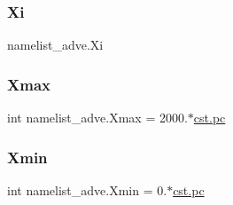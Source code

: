 \subsubsection{\texorpdfstring{Xi}{Xi}}
{\footnotesize\ttfamily namelist\+\_\+adve.\+Xi}

\mbox{\label{namespacenamelist__adve_a72dd501f8f17b05467f30b55d0507e79}} 
\subsubsection{\texorpdfstring{Xmax}{Xmax}}
{\footnotesize\ttfamily int namelist\+\_\+adve.\+Xmax = 2000.$\ast$\hyperlink{constants_8h_a2884cd030c4c825754349a525a1d06ce}{cst.\+pc}}

\mbox{\label{namespacenamelist__adve_a4c1840cec878f104fe26d7975343fe76}} 
\subsubsection{\texorpdfstring{Xmin}{Xmin}}
{\footnotesize\ttfamily int namelist\+\_\+adve.\+Xmin = 0.$\ast$\hyperlink{constants_8h_a2884cd030c4c825754349a525a1d06ce}{cst.\+pc}}

